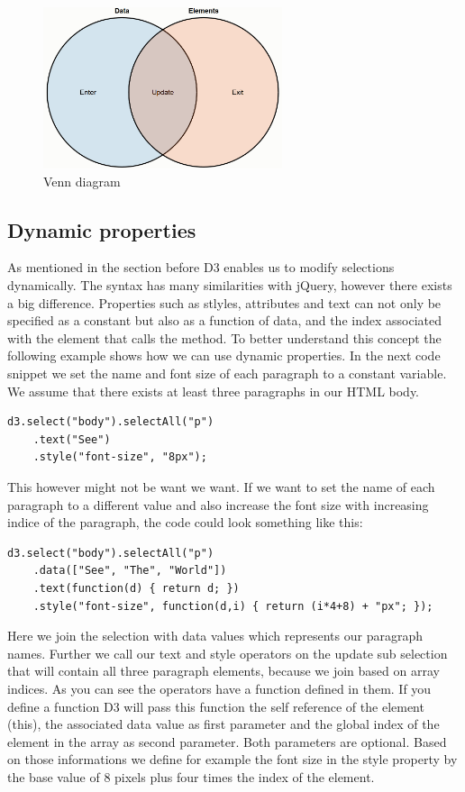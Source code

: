 \documentclass{bioinfo}
\begin{document}
\begin{figure}[!tpb]
\centerline{\includegraphics[width=70mm]{vennDiagram.PNG}} %
\caption{Venn diagram}\label{fig:venn}
\end{figure}


\subsection{Dynamic properties}
As mentioned in the section before D3 enables us to modify selections dynamically.
The syntax has many similarities with jQuery, however there exists a big difference.
Properties such as stlyles, attributes and text can not only be specified as a constant but also as a function of data, and the index associated with the element that calls the method.
To better understand this concept the following example shows how we can use dynamic properties.
In the next code snippet we set the name and font size of each paragraph to a constant variable.
We assume that there exists at least three paragraphs in our HTML body.
\begin{lstlisting}
d3.select("body").selectAll("p")
    .text("See")
    .style("font-size", "8px");
\end{lstlisting}
This however might not be want we want. 
If we want to set the name of each paragraph to a different value and also increase the font size with increasing indice of the paragraph, the code could look something like this:
\begin{lstlisting}
d3.select("body").selectAll("p")
    .data(["See", "The", "World"])
    .text(function(d) { return d; })
    .style("font-size", function(d,i) { return (i*4+8) + "px"; });
\end{lstlisting}
Here we join the selection with data values which represents our paragraph names. Further we call our text and style operators on the update sub selection that will contain all three paragraph elements, because we join based on array indices.
As you can see the operators have a function defined in them. If you define a function D3 will pass this function the self reference of the element (this), the associated data value as first parameter and the global index of the element in the array as second parameter. Both parameters are optional. 
Based on those informations we define for example the font size in the style property by the base value of 8 pixels plus four times the index of the element.
\end{document}
